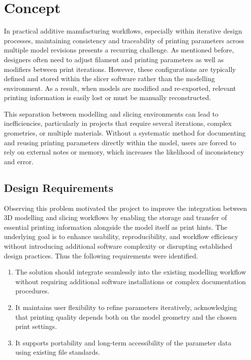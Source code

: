 \chapter{Concept}\label{ch:concept}

In practical additive manufacturing workflows, especially within iterative design processes, maintaining consistency and traceability of printing parameters across multiple model revisions presents a recurring challenge. 
As mentioned before, designers often need to adjust filament and printing parameters as well as modifiers between print iterations. 
However, these configurations are typically defined and stored within the slicer software rather than the modelling environment. 
As a result, when models are modified and re-exported, relevant printing information is easily lost or must be manually reconstructed.

This separation between modelling and slicing environments can lead to inefficiencies, particularly in projects that require several iterations, complex geometries, or multiple materials. 
Without a systematic method for documenting and reusing printing parameters directly within the model, users are forced to rely on external notes or memory, which increases the likelihood of inconsistency and error.

\section{Design Requirements}
Observing this problem motivated the project to improve the integration between 3D modelling and slicing workflows by enabling the storage and transfer of essential printing information alongside the model itself as print hints.
The underlying goal is to enhance usability, reproducibility, and workflow efficiency without introducing additional software complexity or disrupting established design practices. 
Thus the following requirements were identified.

\begin{enumerate}
  \item The solution should integrate seamlessly into the existing modelling workflow without requiring additional software installations or complex documentation procedures.
  \item It maintains user flexibility to refine parameters iteratively, acknowledging that printing quality depends both on the model geometry and the chosen print settings.
  \item It supports portability and long-term accessibility of the parameter data using existing file standards.
\end{enumerate}

